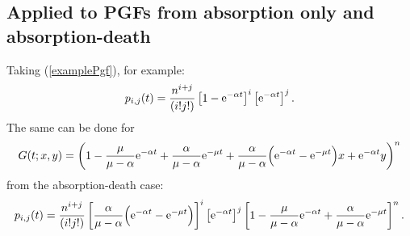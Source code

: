 \subsection*{Applied to PGFs from absorption only and absorption-death }
Taking (\ref{examplePgf}), for example:
$$p_{i,j}(t) = \frac{n^{i+j}}{\left( i!j!\right)} \left[1-{\rm e}^{-\alpha t}\right]^i\left[{\rm e}^{-\alpha t}\right]^j.$$
The same can be done for 
$$G(t;x,y) = \left(1-\frac{\mu}{\mu - \alpha}  {\rm e}^{-\alpha t}  + \frac{\alpha}{\mu - \alpha} {\rm e}^{-\mu t}  + \frac{\alpha}{\mu - \alpha} \Big(   {\rm e}^{-\alpha t} - {\rm e}^{-\mu t} \Big)x +  {\rm e}^{-\alpha t} y\right)^n$$
from the absorption-death case:
$$p_{i,j}(t) = \frac{n^{i+j}}{\left( i!j!\right)} \left[\frac{\alpha}{\mu - \alpha} \Big(   {\rm e}^{-\alpha t} - {\rm e}^{-\mu t} \Big)\right]^i\left[{\rm e}^{-\alpha t}\right]^j\left[1-\frac{\mu}{\mu - \alpha}  {\rm e}^{-\alpha t} + \frac{\alpha}{\mu - \alpha} {\rm e}^{-\mu t}\right]^n.$$





















